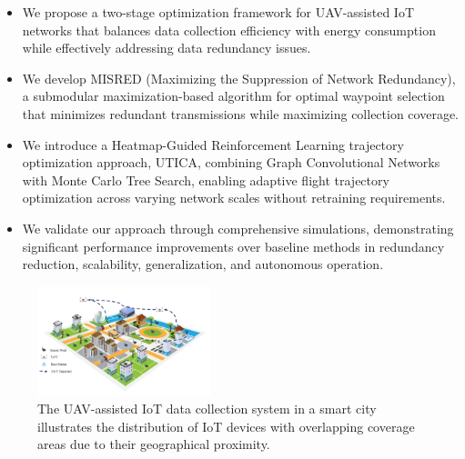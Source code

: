 \documentclass[sigconf]{acmart}
\begin{document}
\begin{itemize}
    \item We propose a two-stage optimization framework for UAV-assisted IoT networks that balances data collection efficiency with energy consumption while effectively addressing data redundancy issues.

    \item We develop MISRED (Maximizing the Suppression of Network Redundancy), a submodular maximization-based algorithm for optimal waypoint selection that minimizes redundant transmissions while maximizing collection coverage.


    \item We introduce a Heatmap-Guided Reinforcement Learning trajectory optimization approach, UTICA, combining Graph Convolutional Networks with Monte Carlo Tree Search, enabling adaptive flight trajectory optimization across varying network scales without retraining requirements.



    \item We validate our approach through comprehensive simulations, demonstrating significant performance improvements over baseline methods in redundancy reduction, scalability, generalization, and autonomous operation.

\end{itemize}





\begin{figure}[htbp]
\centering
\includegraphics[width=0.45\textwidth]{fig/systemModel.png}
\caption{The UAV-assisted IoT data collection system in a smart city illustrates the distribution of IoT devices with overlapping coverage areas due to their geographical proximity.}


\label{fig:system_model}
\end{figure}
\end{document}
